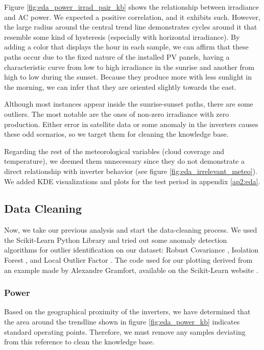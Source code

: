 Figure \ref{fig:eda_power_irrad_pair_kb} shows the relationship between irradiance and AC power. We expected a positive correlation, and it exhibits such. However, the large radius around the central trend line demonstrates cycles around it that resemble some kind of hysteresis (especially with horizontal irradiance). By adding a color that displays the hour in each sample, we can affirm that these paths occur due to the fixed nature of the installed PV panels, having a characteristic curve from low to high irradiance in the sunrise and another from high to low during the sunset. Because they produce more with less sunlight in the morning, we can infer that they are oriented slightly towards the east.

Although most instances appear inside the sunrise-sunset paths, there are some outliers. The most notable are the ones of non-zero irradiance with zero production. Either error in satellite data or some anomaly in the inverters causes these odd scenarios, so we target them for cleaning the knowledge base.

Regarding the rest of the meteorological variables (cloud coverage and temperature), we deemed them unnecessary since they do not demonstrate a direct relationship with inverter behavior (see figure \ref{fig:eda_irrelevant_meteo}). We added KDE visualizations and plots for the test period in appendix \ref{ap2:eda}.


\subsection{Data Cleaning}

Now, we take our previous analysis and start the data-cleaning process. We used the Scikit-Learn Python Library and tried out some anomaly detection algorithms for outlier identification on our dataset: Robust Covariance \cite{Rousseeuw1999}, Isolation Forest \cite{Liu2008} \cite{Liu2012}, and Local Outlier Factor \cite{Breunig2000}. The code used for our plotting derived from an example made by Alexandre Gramfort, available on the Scikit-Learn website \cite{sklearn_example}.

\subsubsection{Power}

Based on the geographical proximity of the inverters, we have determined that the area around the trendline shown in figure \ref{fig:eda_power_kb} indicates standard operating points. Therefore, we must remove any samples deviating from this reference to clean the knowledge base.

